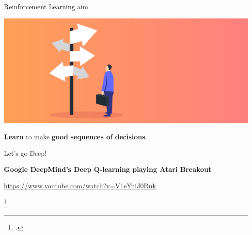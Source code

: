 \documentclass[aspectratio=169,handout]{beamer}
\begin{document}
\begin{frame}{Reinforcement Learning aim}
	\begin{center}
	\includegraphics[width=0.8\linewidth]{img/decision.png}
	
	\textbf{Learn} to make \textbf{good} \textbf{sequences of decisions}.
	
\end{center}
\end{frame}

\begin{frame}{Let's go Deep!}
	
	\alert{\textbf{Google DeepMind's Deep Q-learning playing Atari Breakout}}
	
	\url{https://www.youtube.com/watch?v=V1eYniJ0Rnk}
	
	\centering
	\footcite*{mnih2013playing}
\end{frame}
\end{document}
